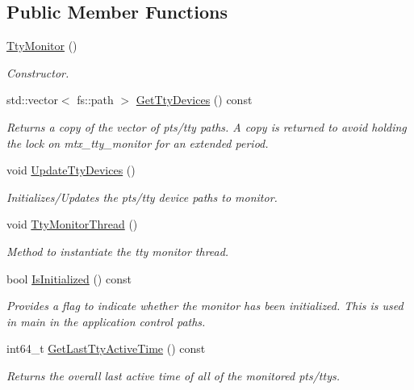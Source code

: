 \subsection*{Public Member Functions}
\begin{DoxyCompactItemize}
\item 
\mbox{\label{classEventDetect_1_1TtyMonitor_acb5eb49281a95f16f0b0dca502fa7625}} 
\mbox{\hyperlink{classEventDetect_1_1TtyMonitor_acb5eb49281a95f16f0b0dca502fa7625}{Tty\+Monitor}} ()
\begin{DoxyCompactList}\small\item\em Constructor. \end{DoxyCompactList}\item 
std\+::vector$<$ fs\+::path $>$ \mbox{\hyperlink{classEventDetect_1_1TtyMonitor_aad86d815a645f6afd9168852d85ccf3c}{Get\+Tty\+Devices}} () const
\begin{DoxyCompactList}\small\item\em Returns a copy of the vector of pts/tty paths. A copy is returned to avoid holding the lock on mtx\+\_\+tty\+\_\+monitor for an extended period. \end{DoxyCompactList}\item 
\mbox{\label{classEventDetect_1_1TtyMonitor_a24535f00a547b861b0d2a12e00b1c6f1}} 
void \mbox{\hyperlink{classEventDetect_1_1TtyMonitor_a24535f00a547b861b0d2a12e00b1c6f1}{Update\+Tty\+Devices}} ()
\begin{DoxyCompactList}\small\item\em Initializes/\+Updates the pts/tty device paths to monitor. \end{DoxyCompactList}\item 
\mbox{\label{classEventDetect_1_1TtyMonitor_a4960b659ae1e97aaab6581964e014703}} 
void \mbox{\hyperlink{classEventDetect_1_1TtyMonitor_a4960b659ae1e97aaab6581964e014703}{Tty\+Monitor\+Thread}} ()
\begin{DoxyCompactList}\small\item\em Method to instantiate the tty monitor thread. \end{DoxyCompactList}\item 
bool \mbox{\hyperlink{classEventDetect_1_1TtyMonitor_a7a3482d371bfa556a13c9ee11ca1a2c2}{Is\+Initialized}} () const
\begin{DoxyCompactList}\small\item\em Provides a flag to indicate whether the monitor has been initialized. This is used in main in the application control paths. \end{DoxyCompactList}\item 
int64\+\_\+t \mbox{\hyperlink{classEventDetect_1_1TtyMonitor_aae27c11393b72229dc03cc4b29f15b80}{Get\+Last\+Tty\+Active\+Time}} () const
\begin{DoxyCompactList}\small\item\em Returns the overall last active time of all of the monitored pts/ttys. \end{DoxyCompactList}\end{DoxyCompactItemize}
